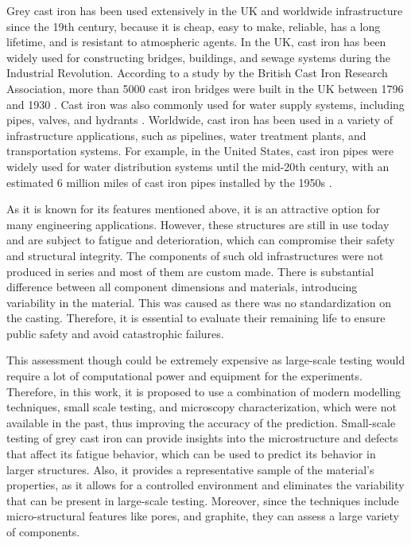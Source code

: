 \documentclass[11pt,a4paper]{article}
\begin{document}
\noindent Grey cast iron has been used extensively in the UK and worldwide infrastructure since the 19th century, because it is cheap, easy to make, reliable, has a long lifetime, and is resistant to atmospheric agents. In the UK, cast iron has been widely used for constructing bridges, buildings, and sewage systems during the Industrial Revolution. According to a study by the British Cast Iron Research Association, more than 5000 cast iron bridges were built in the UK between 1796 and 1930 \cite{doi:10.1680/jenhh.17.00005}. Cast iron was also commonly used for water supply systems, including pipes, valves, and hydrants \cite{cosham2001durability}. Worldwide, cast iron has been used in a variety of infrastructure applications, such as pipelines, water treatment plants, and transportation systems. For example, in the United States, cast iron pipes were widely used for water distribution systems until the mid-20th century, with an estimated 6 million miles of cast iron pipes installed by the 1950s \cite{snider2021preparing}.

\noindent As it is known for its features mentioned above, it is an attractive option for many engineering applications. However, these structures are still in use today and are subject to fatigue and deterioration, which can compromise their safety and structural integrity. The components of such old infrastructures were not produced in series and most of them are custom made. There is substantial difference between all component dimensions and materials, introducing variability in the material. This was caused as there was no standardization on the casting. Therefore, it is essential to evaluate their remaining life to ensure public safety and avoid catastrophic failures.

\noindent This assessment though could be extremely expensive as large-scale testing would require a lot of computational power and equipment for the experiments. Therefore, in this work, it is proposed to use a combination of modern modelling techniques, small scale testing, and microscopy characterization, which were not available in the past, thus improving the accuracy of the prediction. Small-scale testing of grey cast iron can provide insights into the microstructure and defects that affect its fatigue behavior, which can be used to predict its behavior in larger structures. Also, it provides a representative sample of the material's properties, as it allows for a controlled environment and eliminates the variability that can be present in large-scale testing. Moreover, since the techniques include micro-structural features like pores, and graphite, they can assess a large variety of components.
\end{document}
